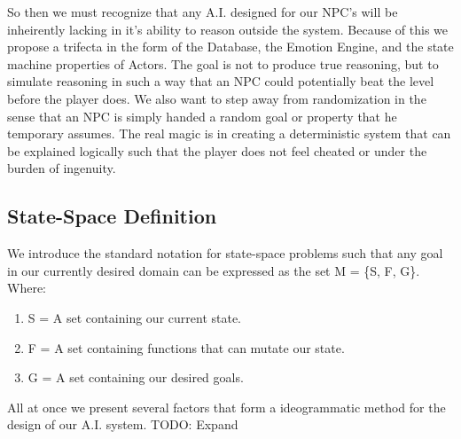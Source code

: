 \documentclass[11pt,twocolumn]{article}
\begin{document}
So then we must recognize that any A.I. designed for our NPC's will be inheirently lacking in it's ability to reason outside the system.  Because of this we propose a trifecta in the form of the Database, the Emotion Engine, and the state machine properties of Actors.  The goal is not to produce true reasoning, but to simulate reasoning in such a way that an NPC could potentially beat the level before the player does.  We also want to step away from randomization in the sense that an NPC is simply handed a random goal or property that he temporary assumes.  The real magic is in creating a deterministic system that can be explained logically such that the player does not feel cheated or under the burden of ingenuity.
\subsection{State-Space Definition}
We introduce the standard notation for state-space problems such that any goal in our currently desired domain can be expressed as the set M = \{S, F, G\}.  Where:
\begin{enumerate}
\item S = A set containing our current state.
\item F = A set containing functions that can mutate our state.
\item G = A set containing our desired goals.
\end{enumerate}

All at once we present several factors that form a ideogrammatic method for the design of our A.I. system. TODO: Expand
\end{document}
